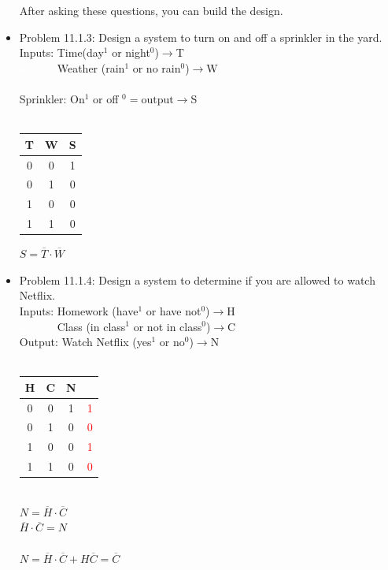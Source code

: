 \documentclass[10pt,a4paper]{article}
\newcommand{\ol}[1]{\overline{#1}}
\begin{document}
\begin{itemize}
After asking these questions, you can build the design.
\item Problem 11.1.3: Design a system to turn on and off a sprinkler in the yard.\\
Inputs: Time(day$^1$ or night$^0$)$\to $T\\
\textcolor{white}{Inputs: }Weather (rain$^1$ or no rain$^0$)$\to $W\\~\\
Sprinkler: On$^1$ or off $^0=\text{output}\to$S\\~\\
\begin{tabular}{|cc|c|}
T & W & S\\
\hline
0 & 0 & 1\\
0 & 1 & 0\\
1 & 0 & 0\\
1 & 1 & 0\\
\end{tabular} $S=\ol{T}\cdot\ol{W}$\\
\item Problem 11.1.4: Design a system to determine if you are allowed to watch Netflix.\\
Inputs: Homework (have$^1$ or have not$^0$)$\to$H\\
\textcolor{white}{Inputs: }Class (in class$^1$ or not in class$^0$)$\to$C\\
Output: Watch Netflix (yes$^1$ or no$^0$)$\to$N\\~\\
\begin{tabular}{|cc|cc|}
H & C & N & \\
\hline
0 & 0 & 1 & \textcolor{red}1\\
0 & 1 & 0 & \textcolor{red}0\\
1 & 0 & 0 & \textcolor{red}1\\
1 & 1 & 0 & \textcolor{red}0\\
\end{tabular}\\
$N=\ol{H}\cdot\ol{C}$\\$\ol{H}\cdot\ol{C}=N$\\~\\
$N=\ol{H}\cdot\ol{C}+H\ol{C}=\ol{C}$\\
\end{itemize}
\end{document}

